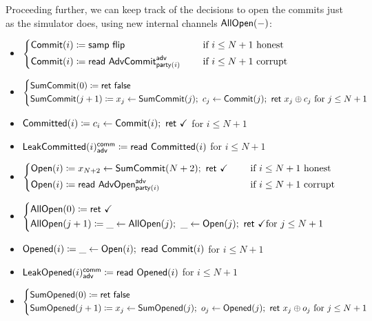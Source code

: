 \noindent Proceeding further, we can keep track of the decisions to open the commits just as the simulator does, using new internal channels $\mathsf{AllOpen}(-)$:

\begin{itemize}
\item {\color{blue} $\begin{cases*} \Commit(i) \coloneqq \samp{\flip} & \hspace{10pt} \text{if $i \leq N+1$ honest} \\ \Commit(i) \coloneqq \read{\AdvCommit^\adv_{\party(i)}} & \hspace{10pt} \text{if $i \leq N+1$ corrupt} \end{cases*}$}
\item {\color{blue} $\begin{cases*} \SumCommit(0) \coloneqq \ret{\false} \\ \SumCommit(j+1) \coloneqq x_j \leftarrow \SumCommit(j); \ c_j \leftarrow \Commit(j); \ \ret{x_j \oplus c_j} \text{ for $j \leq N+1$} \end{cases*}$}
\item {\color{magenta} $\mathsf{Committed}(i) \coloneqq c_i \leftarrow \mathsf{Commit}(i); \ \mathsf{ret} \ \checkmark$ for $i \leq N+1$}
\item {\color{magenta} $\mathsf{LeakCommitted}(i)^{\mathsf{comm}}_{\mathsf{adv}} \coloneqq \mathsf{read} \ \mathsf{Committed}(i)$ for $i \leq N+1$}
\item {\color{teal} $\begin{cases*} \Open(i) \coloneqq x_{N+2} \leftarrow \SumCommit(N+2); \ \ret{\checkmark} & \hspace{10pt} \text{if $i \leq N+1$ honest} \\ \Open(i) \coloneqq \read{\AdvOpen^\adv_{\party(i)}} & \hspace{10pt} \text{if $i \leq N+1$ corrupt} \end{cases*}$}
\item {\color{teal} $\begin{cases*} \AllOpen(0) \coloneqq \ret{\checkmark} \\ \AllOpen(j+1) \coloneqq \_ \leftarrow \AllOpen(j); \ \_ \leftarrow \Open(j); \ \ret{\checkmark} \text{for $j \leq N+1$} \end{cases*}$}
\item {\color{red} $\mathsf{Opened}(i) \coloneqq \_ \leftarrow \mathsf{Open}(i); \ \mathsf{read} \ \mathsf{Commit}(i)$ for $i \leq N+1$}
\item {\color{red} $\mathsf{LeakOpened}(i)^{\mathsf{comm}}_{\mathsf{adv}} \coloneqq \mathsf{read} \ \mathsf{Opened}(i)$ for $i \leq N+1$}
\item {\color{red} $\begin{cases*} \SumOpened(0) \coloneqq \ret{\false} \\ \SumOpened(j+1) \coloneqq x_j \leftarrow \SumOpened(j); \ o_j \leftarrow \Opened(j); \ \ret{x_j \oplus o_j} \text{ for $j \leq N+1$} \end{cases*}$}

\end{itemize}
